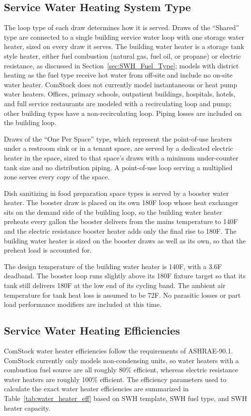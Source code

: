 \subsection{Service Water Heating System Type}

The loop type of each draw determines how it is served. Draws of the ``Shared'' type are connected to a single building service water loop with one storage water heater, sized on every draw it serves. The building water heater is a storage tank style heater, either fuel combustion (natural gas, fuel oil, or propane) or electric resistance, as discussed in Section~\ref{sec:SWH_Fuel_Type}; models with district heating as the fuel type receive hot water from off-site and include no on-site water heater. ComStock does not currently model instantaneous or heat pump water heaters. Offices, primary schools, outpatient buildings, hospitals, hotels, and full service restaurants are modeled with a recirculating loop and pump; other building types have a non-recirculating loop. Piping losses are included on the building loop.

Draws of the ``One Per Space'' type, which represent the point-of-use heaters under a restroom sink or in a tenant space, are served by a dedicated electric heater in the space, sized to that space's draws with a minimum under-counter tank size and no distribution piping. A point-of-use loop serving a multiplied zone serves every copy of the space.

Dish sanitizing in food preparation space types is served by a booster water heater. The booster draw is placed on its own 180\textdegree F loop whose heat exchanger sits on the demand side of the building loop, so the building water heater preheats every gallon the booster delivers from the mains temperature to 140\textdegree F and the electric resistance booster heater adds only the final rise to 180\textdegree F. The building water heater is sized on the booster draws as well as its own, so that the preheat load is accounted for.

The design temperature of the building water heater is 140\textdegree F, with a 3.6\textdegree F deadband. The booster loop runs slightly above its 180\textdegree F fixture target so that its tank still delivers 180\textdegree F at the low end of its cycling band. The ambient air temperature for tank heat loss is assumed to be 72\textdegree F. No parasitic losses or part load performance modifiers are included at this time.

\subsection{Service Water Heating Efficiencies}

ComStock water heater efficiencies follow the requirements of ASHRAE-90.1. ComStock currently only models non-condensing units, so water heaters with a combustion fuel source are all roughly 80\% efficient, whereas electric resistance water heaters are roughly 100\% efficient. The efficiency parameters used to calculate the exact water heater efficiencies are summarized in Table~\ref{tab:water_heater_eff} based on SWH template, SWH fuel type, and SWH heater capacity.
